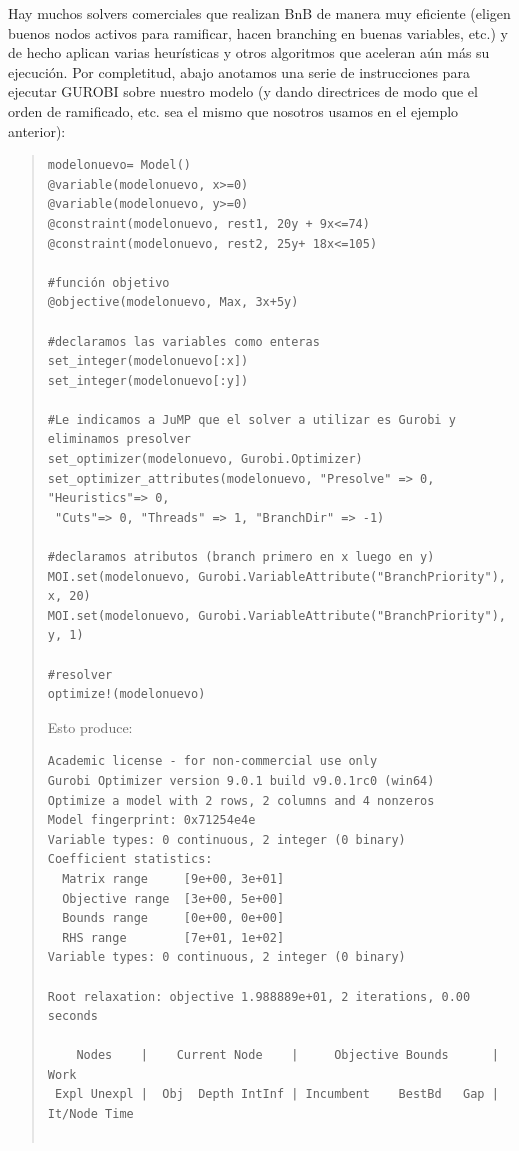     
Hay muchos solvers comerciales que realizan BnB de manera muy eficiente (eligen buenos nodos activos para ramificar, hacen branching en buenas variables, etc.) y de hecho aplican varias heurísticas y otros algoritmos que aceleran aún más su ejecución. Por completitud, abajo anotamos una serie de instrucciones para ejecutar GUROBI sobre nuestro modelo (y dando directrices de modo que el orden de ramificado, etc. sea el mismo que nosotros usamos en el ejemplo anterior):

    	\begin{quote}
    		\begin{lstlisting}
modelonuevo= Model()
@variable(modelonuevo, x>=0)
@variable(modelonuevo, y>=0)
@constraint(modelonuevo, rest1, 20y + 9x<=74)
@constraint(modelonuevo, rest2, 25y+ 18x<=105)

#función objetivo
@objective(modelonuevo, Max, 3x+5y)

#declaramos las variables como enteras
set_integer(modelonuevo[:x])
set_integer(modelonuevo[:y])

#Le indicamos a JuMP que el solver a utilizar es Gurobi y eliminamos presolver
set_optimizer(modelonuevo, Gurobi.Optimizer)
set_optimizer_attributes(modelonuevo, "Presolve" => 0, "Heuristics"=> 0, 
 "Cuts"=> 0, "Threads" => 1, "BranchDir" => -1) 

#declaramos atributos (branch primero en x luego en y)
MOI.set(modelonuevo, Gurobi.VariableAttribute("BranchPriority"), x, 20)  
MOI.set(modelonuevo, Gurobi.VariableAttribute("BranchPriority"), y, 1)  

#resolver
optimize!(modelonuevo)
\end{lstlisting}
\vspace{-10pt}
Esto produce:
\vspace{-10pt}
\begin{lstlisting}
Academic license - for non-commercial use only
Gurobi Optimizer version 9.0.1 build v9.0.1rc0 (win64)
Optimize a model with 2 rows, 2 columns and 4 nonzeros
Model fingerprint: 0x71254e4e
Variable types: 0 continuous, 2 integer (0 binary)
Coefficient statistics:
  Matrix range     [9e+00, 3e+01]
  Objective range  [3e+00, 5e+00]
  Bounds range     [0e+00, 0e+00]
  RHS range        [7e+01, 1e+02]
Variable types: 0 continuous, 2 integer (0 binary)

Root relaxation: objective 1.988889e+01, 2 iterations, 0.00 seconds

    Nodes    |    Current Node    |     Objective Bounds      |     Work
 Expl Unexpl |  Obj  Depth IntInf | Incumbent    BestBd   Gap | It/Node Time


\end{lstlisting}
\end{quote}
